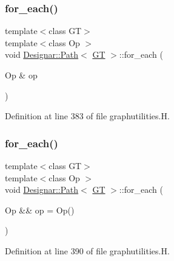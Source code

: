 \subsubsection{\texorpdfstring{for\+\_\+each()}{for\_each()}\hspace{0.1cm}{\footnotesize\ttfamily [3/4]}}
{\footnotesize\ttfamily template$<$class GT$>$ \\
template$<$class Op $>$ \\
void \hyperlink{class_designar_1_1_path}{Designar\+::\+Path}$<$ \hyperlink{demo-buildgraph_8_c_a3001c40d2c31ca87ed96cd7d1334a55e}{GT} $>$\+::for\+\_\+each (\begin{DoxyParamCaption}\item[{Op \&}]{op }\end{DoxyParamCaption})\hspace{0.3cm}{\ttfamily [inline]}}



Definition at line 383 of file graphutilities.\+H.

\mbox{\label{class_designar_1_1_path_aaab972fd915daa207a31f6832a691ef7}} 
\subsubsection{\texorpdfstring{for\+\_\+each()}{for\_each()}\hspace{0.1cm}{\footnotesize\ttfamily [4/4]}}
{\footnotesize\ttfamily template$<$class GT$>$ \\
template$<$class Op $>$ \\
void \hyperlink{class_designar_1_1_path}{Designar\+::\+Path}$<$ \hyperlink{demo-buildgraph_8_c_a3001c40d2c31ca87ed96cd7d1334a55e}{GT} $>$\+::for\+\_\+each (\begin{DoxyParamCaption}\item[{Op \&\&}]{op = {\ttfamily Op()} }\end{DoxyParamCaption})\hspace{0.3cm}{\ttfamily [inline]}}



Definition at line 390 of file graphutilities.\+H.

\mbox{\label{class_designar_1_1_path_a24e7befc93ee9a9db24768f0d3c6ad22}} 
